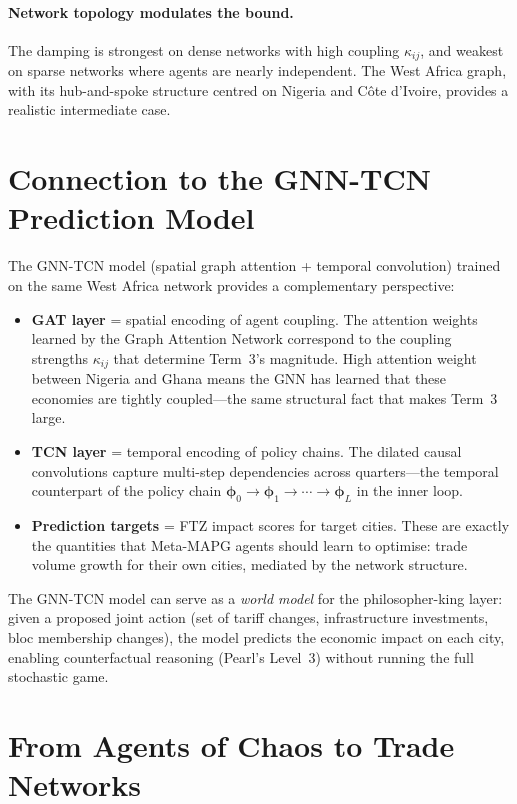 \paragraph{Network topology modulates the bound.} The damping is strongest on dense networks with high coupling $\kappa_{ij}$, and weakest on sparse networks where agents are nearly independent. The West Africa graph, with its hub-and-spoke structure centred on Nigeria and C\^ote d'Ivoire, provides a realistic intermediate case.

\section{Connection to the GNN-TCN Prediction Model}
\label{sec:gnn-connection}

The GNN-TCN model (spatial graph attention + temporal convolution) trained on the same West Africa network provides a complementary perspective:

\begin{itemize}
  \item \textbf{GAT layer} = spatial encoding of agent coupling. The attention weights learned by the Graph Attention Network correspond to the coupling strengths $\kappa_{ij}$ that determine Term~3's magnitude. High attention weight between Nigeria and Ghana means the GNN has learned that these economies are tightly coupled---the same structural fact that makes Term~3 large.
  \item \textbf{TCN layer} = temporal encoding of policy chains. The dilated causal convolutions capture multi-step dependencies across quarters---the temporal counterpart of the policy chain $\bm{\phi}_0 \to \bm{\phi}_1 \to \cdots \to \bm{\phi}_L$ in the inner loop.
  \item \textbf{Prediction targets} = FTZ impact scores for target cities. These are exactly the quantities that Meta-MAPG agents should learn to optimise: trade volume growth for their own cities, mediated by the network structure.
\end{itemize}

The GNN-TCN model can serve as a \emph{world model} for the philosopher-king layer: given a proposed joint action (set of tariff changes, infrastructure investments, bloc membership changes), the model predicts the economic impact on each city, enabling counterfactual reasoning (Pearl's Level~3) without running the full stochastic game.

\section{From Agents of Chaos to Trade Networks}
\label{sec:aoc-to-network}

